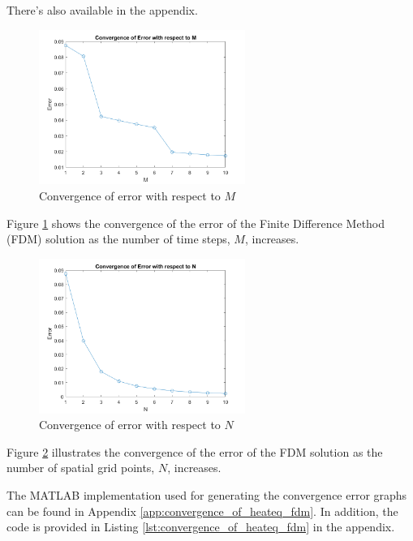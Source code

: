 There's also  available in the appendix.

\begin{figure}[H]
    \centering
    \includegraphics[width=0.6\textwidth]{pdes/fig/converge_error_m.png}
    \caption{Convergence of error with respect to $M$}
    \label{fig:converge_error_m}
\end{figure}

Figure \ref{fig:converge_error_m} shows the convergence of the error of the Finite Difference Method (FDM) solution as the number of time steps, $M$, increases.

\begin{figure}[H]
    \centering
    \includegraphics[width=0.6\textwidth]{pdes/fig/converge_error_n.png}
    \caption{Convergence of error with respect to $N$}
    \label{fig:converge_error_n}
\end{figure}

Figure \ref{fig:converge_error_n} illustrates the convergence of the error of the FDM solution as the number of spatial grid points, $N$, increases.

The MATLAB implementation used for generating the convergence error graphs can be found in Appendix \ref{app:convergence_of_heateq_fdm}. In addition, the code is provided in Listing \ref{lst:convergence_of_heateq_fdm} in the appendix.
